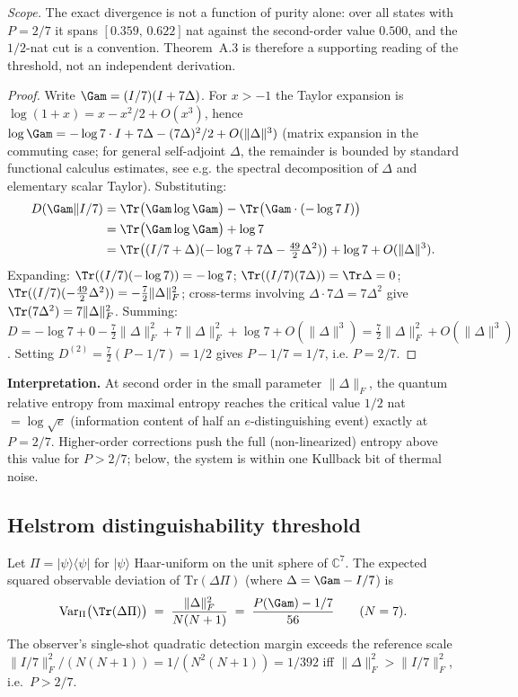 \noindent\emph{Scope.} The exact divergence is not a function of purity alone:
over all states with $P = 2/7$ it spans $[0.359,\,0.622]$\,nat against the
second-order value $0.500$, and the $1/2$-nat cut is a convention. Theorem~A.3 is
therefore a supporting reading of the threshold, not an independent derivation.

\begin{proof}
Write $\Gam = (I/7)(I + 7\Delta)$. For $x > -1$ the Taylor expansion is
$\log(1+x) = x - x^2/2 + O(x^3)$, hence
$\log\Gam = -\log 7\cdot I + 7\Delta - (7\Delta)^2/2 + O(\|\Delta\|^3)$
(matrix expansion in the commuting case; for general self-adjoint $\Delta$,
the remainder is bounded by standard functional calculus estimates,
see e.g. the spectral decomposition of $\Delta$ and elementary scalar Taylor).
Substituting:
\begin{align*}
  D(\Gam \| I/7)
  &= \Tr\bigl(\Gam\log\Gam\bigr) - \Tr\bigl(\Gam \cdot(-\log 7\,I)\bigr) \\
  &= \Tr\bigl(\Gam\log\Gam\bigr) + \log 7 \\
  &= \Tr\bigl((I/7 + \Delta)(-\log 7 + 7\Delta - \tfrac{49}{2}\Delta^2)\bigr) + \log 7 + O(\|\Delta\|^3).
\end{align*}
Expanding: $\Tr((I/7)(-\log 7)) = -\log 7$; $\Tr((I/7)(7\Delta)) = \Tr\Delta = 0$;
$\Tr((I/7)(-\tfrac{49}{2}\Delta^2)) = -\tfrac{7}{2}\|\Delta\|_F^2$; cross-terms involving
$\Delta\cdot 7\Delta = 7\Delta^2$ give $\Tr(7\Delta^2) = 7\|\Delta\|_F^2$.
Summing:
$D = -\log 7 + 0 - \tfrac{7}{2}\|\Delta\|_F^2 + 7\|\Delta\|_F^2 + \log 7 + O(\|\Delta\|^3)
= \tfrac{7}{2}\|\Delta\|_F^2 + O(\|\Delta\|^3)$.
Setting $D^{(2)} = \tfrac{7}{2}(P - 1/7) = 1/2$ gives $P - 1/7 = 1/7$, i.e. $P = 2/7$.
\end{proof}

\textbf{Interpretation.} At second order in the small parameter $\|\Delta\|_F$,
the quantum relative entropy from maximal entropy reaches the critical value
$1/2$ nat $= \log\sqrt{e}$ (information content of half an $e$-distinguishing event) exactly at
$P = 2/7$. Higher-order corrections push the full (non-linearized) entropy
above this value for $P > 2/7$; below, the system is within one Kullback bit
of thermal noise.

\subsection{Helstrom distinguishability threshold}
\label{app:pcrit-helstrom}

\begin{theorembox}
Let $\Pi = |\psi\rangle\langle\psi|$ for $|\psi\rangle$ Haar-uniform on the unit sphere of $\mathbb{C}^7$. The
expected squared observable deviation of $\mathrm{Tr}(\Delta\Pi)$ (where $\Delta = \Gam - I/7$) is
\[
  \mathrm{Var}_{\Pi}\bigl(\Tr(\Delta\Pi)\bigr)
  \;=\;
  \frac{\|\Delta\|_F^2}{N(N+1)}
  \;=\;
  \frac{P(\Gam) - 1/7}{56}
  \qquad (N = 7).
\]
The observer's single-shot quadratic detection margin exceeds the reference
scale $\|I/7\|_F^2/(N(N+1)) = 1/(N^2(N+1)) = 1/392$ iff
$\|\Delta\|_F^2 > \|I/7\|_F^2$, i.e.\ $P > 2/7$.
\end{theorembox}

